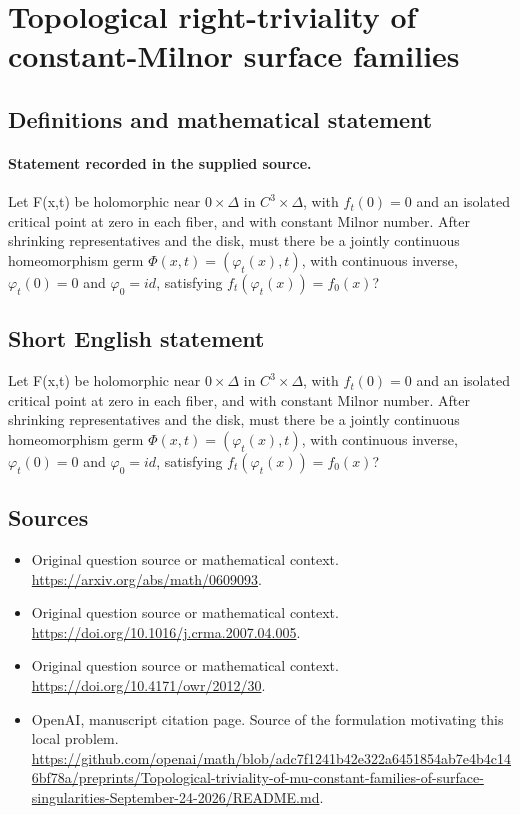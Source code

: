 \documentclass[11pt]{article}
\begin{document}
\section*{Topological right-triviality of constant-Milnor surface families}\label{30007047}
\subsection{Definitions and mathematical statement}
\paragraph{Statement recorded in the supplied source.}
Let F(x,t) be holomorphic near ${0}×\Delta $ in $C^{3}×\Delta $, with $f_t(0)=0$ and an isolated critical point at zero in each fiber, and with constant Milnor number. After shrinking representatives and the disk, must there be a jointly continuous homeomorphism germ $\Phi (x,t)=(\varphi _t(x),t)$, with continuous inverse, $\varphi _t(0)=0$ and $\varphi _{0}=id$, satisfying $f_t(\varphi _t(x))=f_{0}(x)$?
\subsection{Short English statement}
Let F(x,t) be holomorphic near ${0}×\Delta $ in $C^{3}×\Delta $, with $f_t(0)=0$ and an isolated critical point at zero in each fiber, and with constant Milnor number. After shrinking representatives and the disk, must there be a jointly continuous homeomorphism germ $\Phi (x,t)=(\varphi _t(x),t)$, with continuous inverse, $\varphi _t(0)=0$ and $\varphi _{0}=id$, satisfying $f_t(\varphi _t(x))=f_{0}(x)$?
\subsection{Sources}
\begin{itemize}
\item[S1] Original question source or mathematical context.
\url{https://arxiv.org/abs/math/0609093}.
\item[S2] Original question source or mathematical context.
\url{https://doi.org/10.1016/j.crma.2007.04.005}.
\item[S3] Original question source or mathematical context.
\url{https://doi.org/10.4171/owr/2012/30}.
\item[S4] OpenAI, manuscript citation page. Source of the formulation motivating this local problem.
\url{https://github.com/openai/math/blob/adc7f1241b42e322a6451854ab7e4b4c146bf78a/preprints/Topological-triviality-of-mu-constant-families-of-surface-singularities-September-24-2026/README.md}.
\end{itemize}
\end{document}

